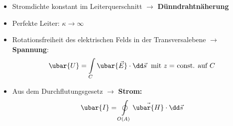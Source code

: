 \begin{itemize}
	\item Stromdichte konstant im Leiterquerschnitt \(\to\) \textbf{Dünndrahtnäherung}
	\item Perfekte Leiter: \(\kappa \to \infty\)
	\item Rotationsfreiheit des elektrischen Felds in der Transversalebene \(\to\) \textbf{Spannung}:
	\begin{equation}
		\ubar{U} = \int\limits_C \ubar{\vec{E}} \cdot \dd \vec{s} \; \text{ mit \(z =\) const. auf \(C\)}
	\end{equation}
	\item Aus dem Durchflutungsgesetz \(\to\) \textbf{Strom:}
	\begin{equation}
		\ubar{I} = \oint\limits_{O(A)} \vec{\ubar{H}} \cdot \dd\vec{s}
	\end{equation}
\end{itemize}

